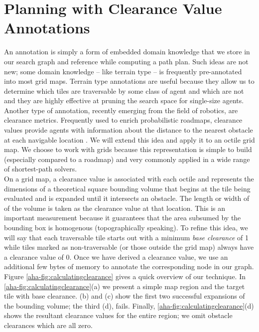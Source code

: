 \section{Planning with Clearance Value Annotations}
\label{aha:annotations}
An annotation is simply a form of embedded domain knowledge that we store in our search graph and reference while computing a path plan. Such ideas are not new; some domain knowledge -- like terrain type --  is frequently pre-annotated into most grid maps. Terrain type annotations are useful because they allow us to determine which tiles are traversable by some class of agent and which are not and they are highly effective at pruning the search space for single-size agents. \\ \newline
Another type of annotation, recently emerging from the field of robotics, are clearance metrics. Frequently used to enrich probabilistic roadmaps, clearance values provide agents with information about the distance to the nearest obstacle at each navigable location \cite{geraerts04}. We will extend this idea and apply it to an octile grid map. We choose to work with grids because this representation is simple to build (especially compared to a roadmap) and very commonly applied in a wide range of shortest-path solvers. \\ \newline
On a grid map, a clearance value is associated with each octile and represents the dimensions of a theoretical square bounding volume that begins at the tile being evaluated and is expanded until it intersects an obstacle. The length or width of of the volume is taken as the clearance value at that location. This is an important measurement because it guarantees that the area subsumed by the bounding box is homogenous (topographically speaking).
To refine this idea, we will say that each traversable tile starts out with a minimum \emph{base clearance} of 1 while tiles marked as non-traversable (or those outside the grid map) always have a clearance value of 0. Once we have derived a clearance value, we use an additional few bytes of memory to annotate the corresponding node in our graph. Figure \ref{aha-fig:calculatingclearance} gives a quick overview of our technique. In \ref{aha-fig:calculatingclearance}(a) we present a simple map region and the target tile with base clearance. (b) and (c) show the first two successful expansions of the bounding volume; the third (d), fails. Finally, \ref{aha-fig:calculatingclearance}(d) shows the resultant clearance values for the entire region; we omit obstacle clearances which are all zero.

